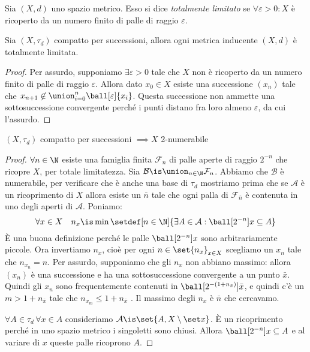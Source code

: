 \begin{defn}
	Sia $(X,d)$ uno spazio metrico. Esso si dice \emph{totalmente limitato} se $\forall \varepsilon > 0:X$ è ricoperto da un numero finito di palle di raggio $\varepsilon$.
\end{defn}

\begin{prop}
	Sia $(X,\tau _d)$ compatto per successioni, allora ogni metrica inducente $(X,d)$ è totalmente limitata.
\end{prop}

\begin{proof}
	Per assurdo, supponiamo $\exists \varepsilon > 0$ tale che $X$ non è ricoperto da un numero finito di palle di raggio $\varepsilon$.
	Allora dato $x_0 \in X$ esiste una successione $(x_n)$ tale che
	$x_{n+1}\not\in\union_{i=0}^n\ball[\varepsilon]{x_i}$.
	Questa successione non ammette una sottosuccessione convergente perché i punti distano fra loro almeno $\varepsilon$, da cui l'assurdo.
\end{proof}

\begin{prop}
	$(X, \tau _d)$ compatto per successioni $\implies X$ 2-numerabile
\end{prop}

\begin{proof}
	$\forall n \in \N$ esiste una famiglia finita $\mathcal{F}_n$ di palle aperte di raggio $2^{-n}$ che ricopre $X$, per totale limitatezza.
	Sia $\mathcal{B} \is \union _{n \in \N} \mathcal F_n$.
	Abbiamo che $\mathcal{B}$ è numerabile, per verificare che è anche una base di $\tau _d$ mostriamo prima che se $\mathcal{A}$ è un ricoprimento di $X$ allora esiste un $\bar n$ tale che ogni palla di $\mathcal F_{\bar n}$ è contenuta in uno degli aperti di $\mathcal{A}$.
	Poniamo:
	\[\forall x\in X\quad n_x\is\min\setdef[n\in\N]{\exists A\in\mathcal A:\ball[2^{-n}]x\subseteq A}\]
	È una buona definizione perché le palle $\ball[2^{-n}]x$ sono arbitrariamente piccole.
	Ora invertiamo $n_x$, cioè per ogni $n\in\set{n_x}_{x\in X}$ scegliamo un $x_n$ tale che $n_{x_n}=n$.
	Per assurdo, supponiamo che gli $n_x$ non abbiano massimo: allora $(x_n)$ è una successione e ha una sottosuccessione convergente a un punto $\bar x$.
	Quindi gli $x_n$ sono frequentemente contenuti in $\ball[2^{-(1+n_{\bar x})}]{\bar x}$, e quindi c'è un $m>1+n_{\bar x}$ tale che $n_{x_m}\le 1+n_{\bar x}$ \absurd.
	Il massimo degli $n_x$ è $\bar n$ che cercavamo.
	
	$\forall A \in \tau _d\,\forall x \in A$ consideriamo $\mathcal{A}\is\set{A, X\setminus\set x}$.
	È un ricoprimento perché in uno spazio metrico i singoletti sono chiusi.
	Allora $\ball[2^{-\bar n}]x\subseteq A$ e al variare di $x$ queste palle ricoprono $A$.
\end{proof}

